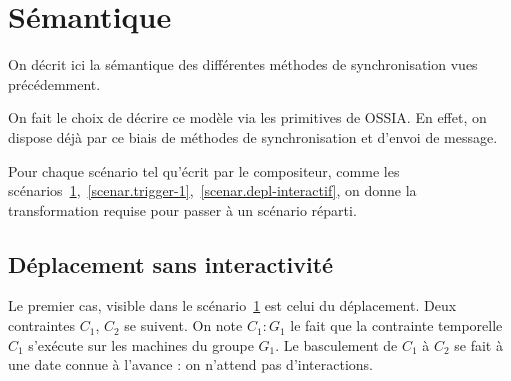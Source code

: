 \documentclass{article}
\newcommand\ossia{OSSIA\xspace}
\begin{document}
\section{Sémantique}\label{sec.semantique}
On décrit ici la sémantique des différentes méthodes de synchronisation vues précédemment.

On fait le choix de décrire ce modèle via les primitives de \ossia{}. 
En effet, on dispose déjà par ce biais de méthodes de synchronisation et d'envoi de message.

Pour chaque scénario tel qu'écrit par le compositeur, comme les scénarios~\ref{scenar.simple},~\ref{scenar.trigger-1},~\ref{scenar.depl-interactif}, on donne la transformation requise pour passer à un scénario réparti.


\subsection{Déplacement sans interactivité}
Le premier cas, visible dans le scénario~\ref{scenar.simple} est celui du déplacement.
Deux contraintes $C_1$, $C_2$ se suivent. 
On note $C_1 : G_1$ le fait que la contrainte temporelle $C_1$ s'exécute sur les machines du groupe $G_1$.
Le basculement de $C_1$ à $C_2$ se fait à une date connue à l'avance : on n'attend pas d'interactions.

\begin{figure}[h]
    \centering
    \begin{tikzpicture}
    
    \end{tikzpicture}
    \label{scenar.simple}
\end{figure} 
\end{document}
